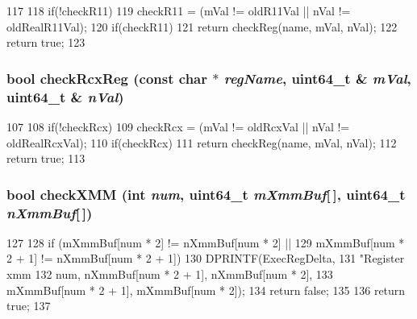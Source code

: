 \begin{DoxyCode}
117 {
118     if(!checkR11)
119         checkR11 = (mVal != oldR11Val || nVal != oldRealR11Val);
120     if(checkR11)
121         return checkReg(name, mVal, nVal);
122     return true;
123 }
\end{DoxyCode}
\hypertarget{classTrace_1_1X86NativeTrace_a3b44534ea889f35c16accfb8c67bee63}{
\subsubsection[{checkRcxReg}]{\setlength{\rightskip}{0pt plus 5cm}bool checkRcxReg (const char $\ast$ {\em regName}, \/  uint64\_\-t \& {\em mVal}, \/  uint64\_\-t \& {\em nVal})}}
\label{classTrace_1_1X86NativeTrace_a3b44534ea889f35c16accfb8c67bee63}



\begin{DoxyCode}
107 {
108     if(!checkRcx)
109         checkRcx = (mVal != oldRcxVal || nVal != oldRealRcxVal);
110     if(checkRcx)
111         return checkReg(name, mVal, nVal);
112     return true;
113 }
\end{DoxyCode}
\hypertarget{classTrace_1_1X86NativeTrace_a1e5c8f953a4bd6df5c37ce64ad70e2fe}{
\subsubsection[{checkXMM}]{\setlength{\rightskip}{0pt plus 5cm}bool checkXMM (int {\em num}, \/  uint64\_\-t {\em mXmmBuf}\mbox{[}$\,$\mbox{]}, \/  uint64\_\-t {\em nXmmBuf}\mbox{[}$\,$\mbox{]})}}
\label{classTrace_1_1X86NativeTrace_a1e5c8f953a4bd6df5c37ce64ad70e2fe}



\begin{DoxyCode}
127 {
128     if (mXmmBuf[num * 2]     != nXmmBuf[num * 2] ||
129         mXmmBuf[num * 2 + 1] != nXmmBuf[num * 2 + 1]) {
130         DPRINTF(ExecRegDelta,
131                 "Register xmm%
132                 num, nXmmBuf[num * 2 + 1], nXmmBuf[num * 2],
133                      mXmmBuf[num * 2 + 1], mXmmBuf[num * 2]);
134         return false;
135     }
136     return true;
137 }
\end{DoxyCode}


